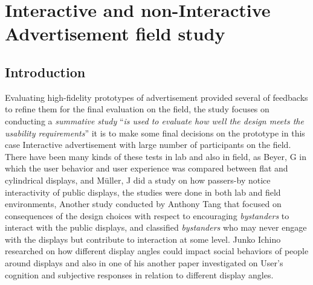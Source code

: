 \chapter{Interactive and non-Interactive Advertisement field study} %

\label{Chapter8} %
\newpage




\section{Introduction}




Evaluating high-fidelity prototypes of advertisement provided several of feedbacks to refine them for the final evaluation on the field, the study focuses on conducting a \emph{summative study} \cite{summative} ``\emph{is used to evaluate how well the design meets the usability requirements}'' it is to make some final decisions on the prototype in this case Interactive advertisement with large number of participants on the field. There have been many kinds of these tests in lab and also in field, as Beyer, G \cite{CylindricalScreen} in which the user behavior and user experience was compared between flat and cylindrical displays, and Müller, J \cite{LookingGlass} did a study on how passers-by notice interactivity of public displays, the studies were done in both lab and field environments, Another study conducted by Anthony Tang \cite{Bystanders} that focused on consequences of the design choices with respect to encouraging \emph{bystanders} to interact with the public displays, and classified \emph{bystanders} who may never engage with the displays but contribute to interaction at some level.
Junko Ichino \cite{DisplayAngleEffect} researched on how different display angles could impact social behaviors of people around displays and also in one of his another paper \cite{DisplayAngleEffect2} investigated on User's cognition and subjective responses in relation to different display angles.

